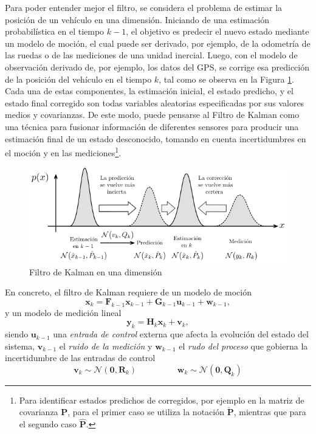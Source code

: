 Para poder entender mejor el filtro, se considera el problema de estimar la posición de un vehículo en una dimensión. Iniciando de una estimación probabilística en el tiempo $k-1$, el objetivo es predecir el nuevo estado mediante un modelo de moción, el cual puede ser derivado, por ejemplo, de la odometría de las ruedas o de las mediciones de una unidad inercial. Luego, con el modelo de observación derivado de, por ejemplo, los datos del GPS, se corrige esa predicción de la posición del vehículo en el tiempo $k$, tal como se observa en la Figura \ref{fig:kalmanfilter}. Cada una de estas componentes, la estimación inicial, el estado predicho, y el estado final corregido son todas variables aleatorias especificadas por sus valores medios y covarianzas. De este modo, puede pensarse al Filtro de Kalman como una técnica para fusionar información de diferentes sensores para producir una estimación final de un estado desconocido, tomando en cuenta incertidumbres en el moción y en las mediciones\footnote{Para identificar estados predichos de corregidos, por ejemplo en la matriz de covarianza $\bm{P}$, para el primer caso se utiliza la notación $\check{\bm{P}}$, mientras que para el segundo caso $\hat{\bm{P}}$.}.

\begin{figure}
    \centering
    \includegraphics[width=\textwidth]{Img/KalmanFilter.png}
    \caption{Filtro de Kalman en una dimensión}
    \label{fig:kalmanfilter}
\end{figure}

En concreto, el filtro de Kalman requiere de un modelo de moción
\begin{equation}
    \bm{x}_k = \bm{F}_{k-1}\bm{x}_{k-1} + \bm{G}_{k-1}\bm{u}_{k-1} + \bm{w}_{k-1},
\end{equation}
y un modelo de medición lineal
\begin{equation}
    \bm{y}_k = \bm{H}_k\bm{x}_k + \bm{v}_k,
\end{equation}
siendo $\bm{u}_{k-1}$ una \textit{entrada de control} externa que afecta la evolución del estado del sistema, $\bm{v}_{k-1}$ el \textit{ruido de la medición} y $\bm{w}_{k-1}$ el \textit{rudo del proceso} que gobierna la incertidumbre de las entradas de control
\begin{equation}
    \bm{v}_k \sim \mathcal{N}(\bm{0},\bm{R}_k)\hspace{2cm}\bm{w}_k \sim \mathcal{N}(\bm{0},\bm{Q}_k)
\end{equation}


